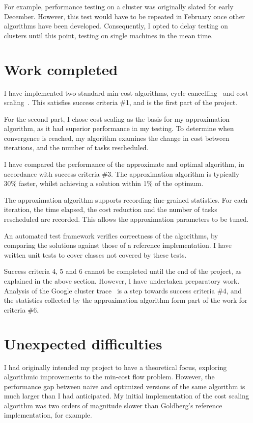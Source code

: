 For example, performance testing on a cluster was originally slated for early December. However, this test would have to be repeated in February once other algorithms have been developed. Consequently, I opted to delay testing on clusters until this point, testing on single machines in the mean time.

\section{Work completed}

I have implemented two standard min-cost algorithms, cycle cancelling~\cite{Klein:1967} and cost scaling~\cite{Goldberg:1987}. This satisfies success criteria \#1, and is the first part of the project.

For the second part, I chose cost scaling as the basis for my approximation algorithm, as it had superior performance in my testing. To determine when convergence is reached, my algorithm examines the change in cost between iterations, and the number of tasks rescheduled.

I have compared the performance of the approximate and optimal algorithm, in accordance with success criteria \#3. The approximation algorithm is typically 30\% faster, whilst achieving a solution within 1\% of the optimum. 

The approximation algorithm supports recording fine-grained statistics. For each iteration, the time elapsed, the cost reduction and the number of tasks rescheduled are recorded. This allows the approximation parameters to be tuned.

An automated test framework verifies correctness of the algorithms, by comparing the solutions against those of a reference implementation. I have written unit tests to cover classes not covered by these tests.

Success criteria 4, 5 and 6 cannot be completed until the end of the project, as explained in the above section. However, I have undertaken preparatory work. Analysis of the Google cluster trace~\cite{clusterdata:Wilkes2011} is a step towards success criteria \#4, and the statistics collected by the approximation algorithm form part of the work for criteria \#6.

\section{Unexpected difficulties}

I had originally intended my project to have a theoretical focus, exploring algorithmic improvements to the min-cost flow problem. However, the performance gap between naive and optimized versions of the same algorithm is much larger than I had anticipated. My initial implementation of the cost scaling algorithm was two orders of magnitude slower than Goldberg's reference implementation, for example. 

